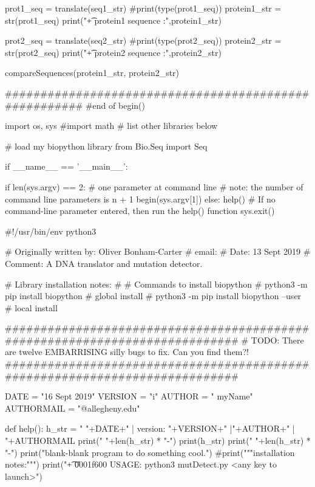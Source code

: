     prot1_seq = translate(seq1_str)
    #print(type(prot1_seq))
    protein1_str = str(prot1_seq)
    print("\t + protein1 sequence  :",protein1_str)

    prot2_seq = translate(seq2_str)
    #print(type(prot2_seq))
    protein2_str = str(prot2_seq)
    print("\t + protein2 sequence  :",protein2_str)

    compareSequences(protein1_str, protein2_str)

######################################################
#end of begin()



import os, sys
#import math
# list other libraries below

# load my biopython library
from Bio.Seq import Seq


if __name__ == '__main__':

        if len(sys.argv) == 2: # one parameter at command line
        # note: the number of command line parameters is n + 1
                begin(sys.argv[1])
        else:
                help() # If no command-line parameter entered, then run the help() function
                sys.exit()





#!/usr/bin/env python3

# Originally written by: Oliver Bonham-Carter
# email:
# Date: 13 Sept 2019
# Comment: A DNA translator and mutation detector.

# Library installation notes:
#
# Commands to install biopython
# python3 -m pip install biopython # global install
# python3 -m pip install biopython –user # local install

############################################################################
# TODO: There are twelve EMBARRISING silly bugs to fix. Can you find them?!
############################################################################

DATE = "16 Sept 2019"
VERSION = "i"
AUTHOR = " myName"
AUTHORMAIL = "@allegheny.edu"

def help():
        h_str = "   "+DATE+" | version: "+VERSION+" |"+AUTHOR+" | "+AUTHORMAIL
        print("  "+len(h_str) * "-")
        print(h_str)
        print("  "+len(h_str) * "-")
        print("\n\tThe blank-blank program to do something cool.")
        #print("""\n\tLibrary installation notes:""")
        print("\t+ \U0001f600  USAGE: python3 mutDetect.py <any key to launch>")

